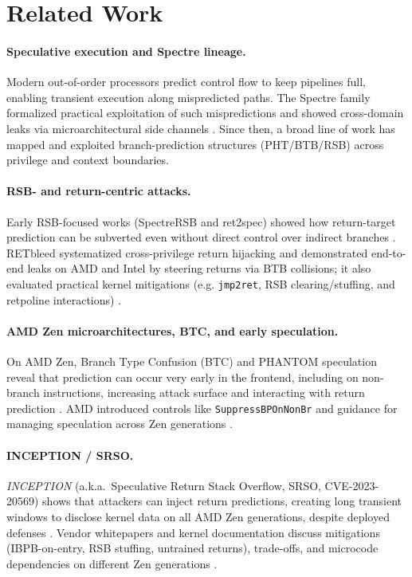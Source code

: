 \documentclass[11pt,a4paper]{article}
\begin{document}
\section{Related Work}
\label{sec:related}

\paragraph{Speculative execution and Spectre lineage.} Modern out-of-order processors predict control flow to keep pipelines full, enabling transient execution along mispredicted paths. The Spectre family formalized practical exploitation of such mispredictions and showed cross-domain leaks via microarchitectural side channels \cite{kocher2018spectre}. Since then, a broad line of work has mapped and exploited branch-prediction structures (PHT/BTB/RSB) across privilege and context boundaries.

\paragraph{RSB- and return-centric attacks.}
Early RSB-focused works (SpectreRSB and ret2spec) showed how return-target prediction can be subverted even without direct control over indirect branches \cite{koruyeh2018spectrersb,maisuradze2018ret2spec}. RETbleed systematized cross-privilege return hijacking and demonstrated end-to-end leaks on AMD and Intel by steering returns via BTB collisions; it also evaluated practical kernel mitigations (e.g. \texttt{jmp2ret}, RSB clearing/stuffing, and retpoline interactions) \cite{wikner2022retbleed}.

\paragraph{AMD Zen microarchitectures, BTC, and early speculation.}
On AMD Zen, Branch Type Confusion (BTC) and PHANTOM speculation reveal that prediction can occur very early in the frontend, including on non-branch instructions, increasing attack surface and interacting with return prediction \cite{amd2022btc,wikner2023phantom}. AMD introduced controls like \texttt{SuppressBPOnNonBr} and guidance for managing speculation across Zen generations \cite{amd2022btc,amd_software_spec}.

\paragraph{INCEPTION / SRSO.}
\emph{INCEPTION} (a.k.a.\ Speculative Return Stack Overflow, SRSO, CVE-2023-20569) shows that attackers can inject return predictions, creating long transient windows to disclose kernel data on all AMD Zen generations, despite deployed defenses \cite{trujillo2023inception,nvd_cve_2023_20569,amd_sb7005,linux_srso_doc}. Vendor whitepapers and kernel documentation discuss mitigations (IBPB-on-entry, RSB stuffing, untrained returns), trade-offs, and microcode dependencies on different Zen generations \cite{amd_srso_whitepaper,linux_srso_doc}.
\end{document}
